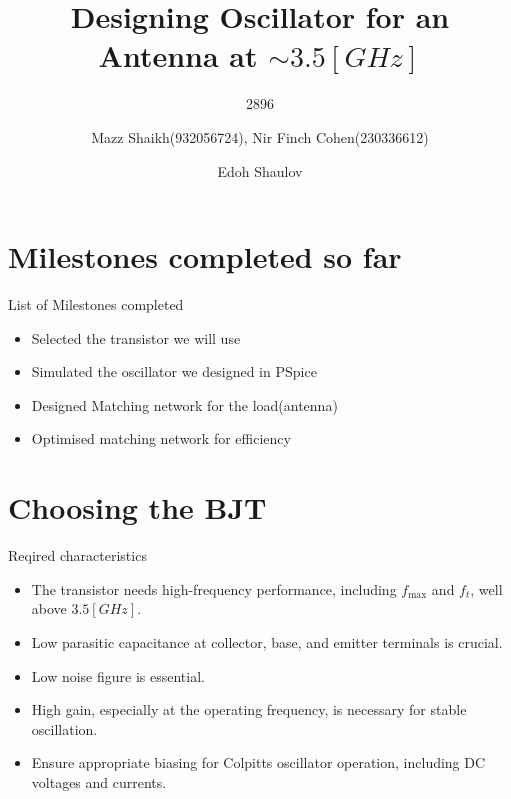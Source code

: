 \documentclass{beamer}
\title{Designing Oscillator for an Antenna at \(\sim3.5[GHz]\)}
\date{}
\subtitle{2896}
\author{Mazz Shaikh(932056724), Nir Finch Cohen(230336612)}
\date{Edoh Shaulov}
\institute{Tel Aviv University}
\begin{document}
\maketitle


\section{Milestones completed so far}

\begin{frame}{List of Milestones completed}

  \begin{itemize}
    \item<1-> Selected the transistor we will use
    \item<2-> Simulated the oscillator we designed in PSpice
    \item<3-> Designed Matching network for the load(antenna)
    \item<4-> Optimised matching network for efficiency
  \end{itemize}
  
  

\end{frame}





\section{Choosing the BJT}
\begin{frame}{Reqired characteristics}
  \begin{itemize}
    \item <1-> The transistor needs high-frequency performance, including \(f_{\text{max}}\) and \(f_t\), well above \(3.5[GHz]\).
    \item <2-> Low parasitic capacitance at collector, base, and emitter terminals is crucial.
    \item <3-> Low noise figure is essential.
    \item <4-> High gain, especially at the operating frequency, is necessary for stable oscillation.
    \item <5-> Ensure appropriate biasing for Colpitts oscillator operation, including DC voltages and currents.
  \end{itemize}
\end{frame}
\end{document}

